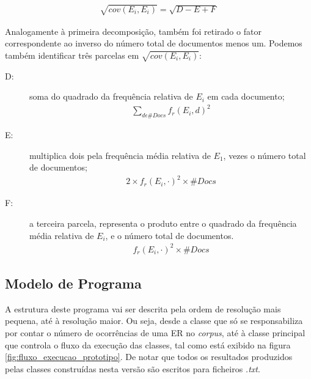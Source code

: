 \begin{equation}
\begin{aligned}
\sqrt{cov(E_{i}, E_{i})} = \sqrt{ D - E + F }
\end{aligned}
\end{equation}

Analogamente à primeira decomposição, também foi retirado o fator correspondente ao inverso do número total de documentos menos um. Podemos também identificar três parcelas em $\sqrt{cov(E_{i}, E_{i})}$:
\begin{description}
\item[D:] soma do quadrado da frequência relativa de $E_{i}$ em cada documento;
\begin{equation}
\begin{aligned}
\sum_{d \epsilon \#Docs} f_{r}(E_{i}, d)^{2}
\end{aligned}
\end{equation}
\item[E:] multiplica dois pela frequência média relativa de $E_{1}$, vezes o número total de documentos;
\begin{equation}
\begin{aligned}
2\times f_{r}(E_{i}, \cdot )^{2} \times \#Docs
\end{aligned}
\end{equation}
\item[F:] a terceira parcela, representa o produto entre o quadrado da frequência média relativa de $E_{i}$, e o número total de documentos.
\begin{equation}
\begin{aligned}
f_{r}(E_{i}, \cdot )^{2} \times \#Docs
\end{aligned}
\end{equation}
\end{description}

\subsection{Modelo de Programa}
A estrutura deste programa vai ser descrita pela ordem de resolução mais pequena, até à resolução maior. Ou seja, desde a classe que só se responsabiliza por contar o número de ocorrências de uma ER no \textit{corpus}, até à classe principal que controla o fluxo da execução das classes, tal como está exibido na figura \ref{fig:fluxo_execucao_prototipo}. De notar que todos os resultados produzidos pelas classes construídas nesta versão são escritos para ficheiros \textit{.txt}.

